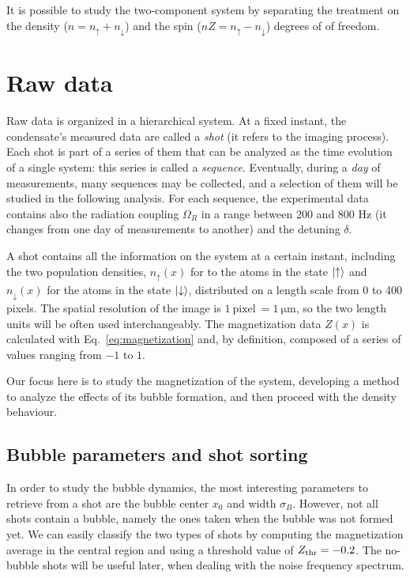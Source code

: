 It is possible to study the two-component system by separating the treatment on the density ($n = n_\uparrow + n_\downarrow$) and the spin ($nZ = n_\uparrow - n_\downarrow$) degrees of of freedom. 

\section{Raw data}
Raw data is organized in a hierarchical system. At a fixed instant, the condensate's measured data are called a \textit{shot} (it refers to the imaging process). Each shot is part of a series of them that can be analyzed as the time evolution of a single system: this series is called a \textit{sequence}. Eventually, during a \textit{day} of measurements, many sequences may be collected, and a selection of them will be studied in the following analysis. For each sequence, the experimental data contains also the radiation coupling $\Omega_R$ in a range between 200 and 800 \unit{\hertz} (it changes from one day of measurements to another) and the detuning $\delta$.

A shot contains all the information on the system at a certain instant, including the two population densities, $n_\uparrow(x)$ for to the atoms in the state $\ket{\uparrow}$ and $n_\downarrow(x)$ for the atoms in the state $\ket{\downarrow}$, distributed on a length scale from 0 to 400 pixels. The spatial resolution of the image is $1\ \text{pixel}\ = 1\ \unit{\micro\meter}$, so the two length units will be often used interchangeably. The magnetization data $Z(x)$ is calculated with Eq.\ \eqref{eq:magnetization} and, by definition, composed of a series of values ranging from $-1$ to $1$.

Our focus here is to study the magnetization of the system, developing a method to analyze the effects of its bubble formation, and then proceed with the density behaviour.

\subsection{Bubble parameters and shot sorting}
In order to study the bubble dynamics, the most interesting parameters to retrieve from a shot are the bubble center $x_0$ and width $\sigma_B$. However, not all shots contain a bubble, namely the ones taken when the bubble was not formed yet. We can easily classify the two types of shots by computing the magnetization average in the central region and using a threshold value of $Z_{\rm thr} = -0.2$. The no-bubble shots will be useful later, when dealing with the noise frequency spectrum.

